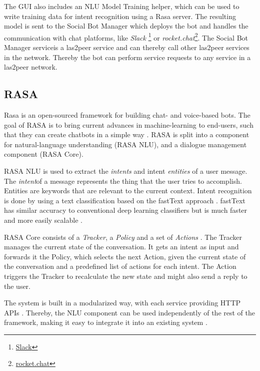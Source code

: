 The GUI also includes an NLU Model Training helper, which can be used to write training data for intent recognition using a Rasa server.
The resulting model is sent to the Social Bot Manager which deploys the bot and handles the communication with chat platforms, like \emph{Slack} \footnote{\href{https://slack.com/}{Slack}} or \emph{rocket.chat}\footnote{\href{https://rocket.chat/}{rocket.chat}}. 
The Social Bot Manager service\footnotemark is a las2peer service and can thereby call other las2peer services in the network. 
Thereby the bot can perform service requests to any service in a las2peer network.

\subsection{RASA}
Rasa is an open-sourced framework for building chat- and voice-based bots. The goal of RASA is to bring current advances in machine-learning to end-users, such that they can create chatbots in a simple way \cite{BFPN17}. 
RASA is split into a component for natural-language understanding (RASA NLU), and a dialogue management component (RASA Core).

RASA NLU is used to extract the \emph{intents} and intent \emph{entities} of a user message.
The \emph{intent}\footnotemark of a message represents the thing that the user tries to accomplish. 
Entities are keywords that are relevant to the current context.
Intent recognition is done by using a text classification based on the fastText approach \cite{BFPN17}. 
fastText has similar accuracy to conventional deep learning classifiers but is much faster and more easily scalable \cite{JGBM16}.

RASA Core consists of a \emph{Tracker}, a \emph{Policy} and a set of \emph{Actions} \cite{BFPN17}. The Tracker manages the current state of the conversation. It gets an intent as input and forwards it the Policy, which selects the next Action, given the current state of the conversation and a predefined list of actions for each intent. The Action triggers the Tracker to recalculate the new state and might also send a reply to the user.

The system is built in a modularized way, with each service providing HTTP APIs \cite{BFPN17}. Thereby, the NLU component can be used independently of the rest of the framework, making it easy to integrate it into an existing system \cite{RaKe19}.


